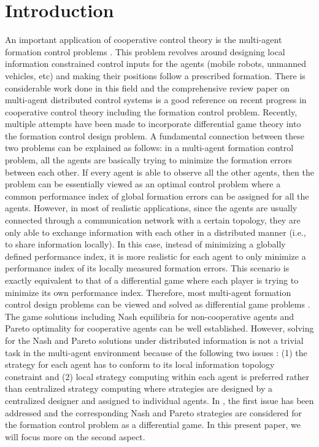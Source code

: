 \documentclass[10pt,doublecolumn]{IEEEtran}  %
\begin{document}
\newtheorem{Def}{Definition}
\newtheorem{Asu}{Assumption}
\newtheorem{thm}{Theorem}
\newtheorem{Pro}{Proposition}
\newtheorem{Alg}{Algorithm}
\newtheorem{Lem}{Lemma}
\newtheorem{Rmk}{Remark}
\newtheorem{Cor}{Corollary}

\section{Introduction}
An important application of cooperative control theory \cite{ren,Qu} is the multi-agent formation control problems \cite{Stipanovic2004,Keviczky2008,JiananWang2012}. This problem revolves around designing  local information constrained control inputs for the agents (mobile robots, unmanned vehicles, etc) and making their positions follow a prescribed formation. There  is considerable work  done in this field and the comprehensive review paper \cite{Cao2013} on multi-agent distributed control systems is a good reference on recent progress in cooperative control theory including the formation control problem. Recently, multiple attempts \cite{anderson1998formation,DongbingGu2008,SemsarKazerooni20092205} have been made to incorporate differential  game theory \cite{Isaacs,Basar} into the formation control design problem. A fundamental connection between these two problems can be explained as follows: in a multi-agent formation control problem, all the agents are basically trying to minimize the formation errors between each other. If every agent is able to observe all the other agents, then the problem can be essentially viewed as an optimal control problem where a common performance index of global formation errors can be assigned for all the agents. However, in most of realistic applications, since the agents are usually connected through a communication network  with  a certain topology, they are only able to exchange information with each other in a distributed manner (i.e., to share information locally). In this case, instead of minimizing a globally defined performance index, it is  more realistic  for each agent to only minimize a performance index of its locally measured formation errors. This scenario is exactly equivalent to that of a differential game where each player is trying to minimize its own performance index. Therefore, most  multi-agent  formation control design  problems  can be viewed and solved as  differential game problems . The game solutions including  Nash equilibria for non-cooperative agents and Pareto optimality for cooperative agents can be well established. However, solving  for  the Nash and Pareto solutions under distributed information is not a trivial task in the multi-agent environment because of the following two  issues : (1) the strategy for each agent has to conform to its local information topology constraint and (2) local strategy computing within each agent is preferred rather than centralized strategy computing where strategies are designed by a centralized designer and assigned to individual agents.  In \cite{DongbingGu2008,SemsarKazerooni20092205}, the first  issue  has been addressed and the corresponding Nash and Pareto strategies are considered for the formation control problem as a differential game. In this present paper, we will focus more on the second aspect. 
\end{document}
